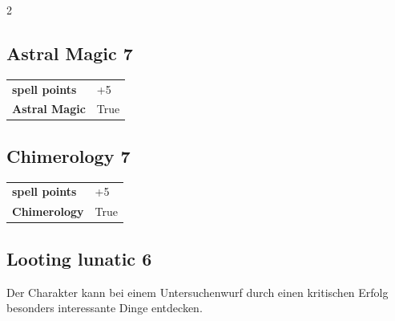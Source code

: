 \begin{multicols}{2}
\begin{tcolorbox}
    \subsection*{Astral Magic \hfill \small{7 }}
    \tcblower




\begin{tabular}{@{}ll@{}}
    \textbf{spell points} & +5\\
    \textbf{Astral Magic} & True\\
\end{tabular}


\end{tcolorbox}

\begin{tcolorbox}
    \subsection*{Chimerology \hfill \small{7 }}
    \tcblower




\begin{tabular}{@{}ll@{}}
    \textbf{spell points} & +5\\
    \textbf{Chimerology} & True\\
\end{tabular}


\end{tcolorbox}

\begin{tcolorbox}
    \subsection*{Looting lunatic \hfill \small{6 }}
    \tcblower
Der Charakter kann bei einem Untersuchenwurf durch einen kritischen Erfolg besonders interessante  Dinge entdecken.


\vspace{3mm}




\end{tcolorbox}
\end{multicols}

